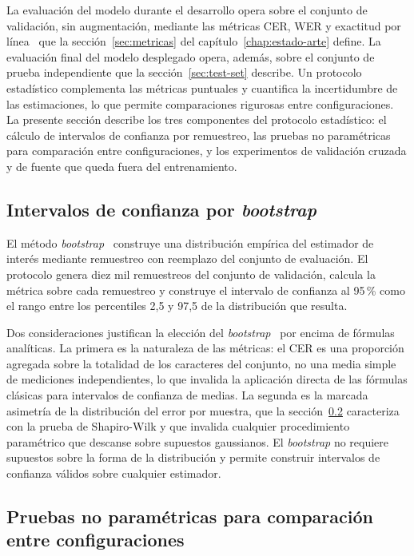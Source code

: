 La evaluación del modelo durante el desarrollo opera sobre el conjunto de validación, sin augmentación, mediante las métricas CER, WER y exactitud por línea~\cite{jurafsky2024slp} que la sección~\ref{sec:metricas} del capítulo~\ref{chap:estado-arte} define. La evaluación final del modelo desplegado opera, además, sobre el conjunto de prueba independiente que la sección~\ref{sec:test-set} describe. Un protocolo estadístico complementa las métricas puntuales y cuantifica la incertidumbre de las estimaciones, lo que permite comparaciones rigurosas entre configuraciones. La presente sección describe los tres componentes del protocolo estadístico: el cálculo de intervalos de confianza por remuestreo, las pruebas no paramétricas para comparación entre configuraciones, y los experimentos de validación cruzada y de fuente que queda fuera del entrenamiento.

\subsection{Intervalos de confianza por \textit{bootstrap}}
\label{subsec:bootstrap}

El método \textit{bootstrap}~\cite{efron1979bootstrap} construye una distribución empírica del estimador de interés mediante remuestreo con reemplazo del conjunto de evaluación. El protocolo genera diez mil remuestreos del conjunto de validación, calcula la métrica sobre cada remuestreo y construye el intervalo de confianza al 95\,\% como el rango entre los percentiles 2,5 y 97,5 de la distribución que resulta.

Dos consideraciones justifican la elección del \textit{bootstrap}~\cite{efron1979bootstrap} por encima de fórmulas analíticas. La primera es la naturaleza de las métricas: el CER es una proporción agregada sobre la totalidad de los caracteres del conjunto, no una media simple de mediciones independientes, lo que invalida la aplicación directa de las fórmulas clásicas para intervalos de confianza de medias. La segunda es la marcada asimetría de la distribución del error por muestra, que la sección~\ref{subsec:tests} caracteriza con la prueba de Shapiro-Wilk y que invalida cualquier procedimiento paramétrico que descanse sobre supuestos gaussianos. El \textit{bootstrap} no requiere supuestos sobre la forma de la distribución y permite construir intervalos de confianza válidos sobre cualquier estimador.

\subsection{Pruebas no paramétricas para comparación entre configuraciones}
\label{subsec:tests}

